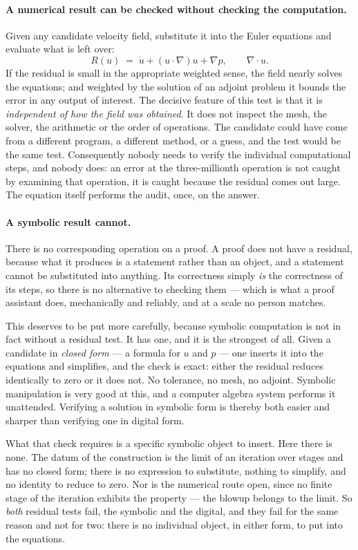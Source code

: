 \documentclass[11pt]{article}
\begin{document}
\paragraph{A numerical result can be checked without checking the computation.} Given any candidate
velocity field, substitute it into the Euler equations and evaluate what is left over:
\[
R(u) \;=\; \dot u + (u\cdot\nabla)u + \nabla p ,\qquad \nabla\cdot u .
\]
If the residual is small in the appropriate weighted sense, the field nearly solves the equations;
and weighted by the solution of an adjoint problem it bounds the error in any output of interest.
The decisive feature of this test is that it is \emph{independent of how the field was obtained}. It
does not inspect the mesh, the solver, the arithmetic or the order of operations. The candidate could
have come from a different program, a different method, or a guess, and the test would be the same
test. Consequently nobody needs to verify the individual computational steps, and nobody does: an
error at the three-millionth operation is not caught by examining that operation, it is caught
because the residual comes out large. The equation itself performs the audit, once, on the answer.

\paragraph{A symbolic result cannot.} There is no corresponding operation on a proof. A proof does
not have a residual, because what it produces is a statement rather than an object, and a statement
cannot be substituted into anything. Its correctness simply \emph{is} the correctness of its steps,
so there is no alternative to checking them --- which is what a proof assistant does, mechanically
and reliably, and at a scale no person matches.

This deserves to be put more carefully, because symbolic computation is not in fact without a
residual test. It has one, and it is the strongest of all. Given a candidate in \emph{closed form}
--- a formula for $u$ and $p$ --- one inserts it into the equations and simplifies, and the check is
exact: either the residual reduces identically to zero or it does not. No tolerance, no mesh, no
adjoint. Symbolic manipulation is very good at this, and a computer algebra system performs it
unattended. Verifying a solution in symbolic form is thereby both easier and sharper than verifying
one in digital form.

What that check requires is a specific symbolic object to insert. Here there is none. The datum of
the construction is the limit of an iteration over stages and has no closed form; there is no
expression to substitute, nothing to simplify, and no identity to reduce to zero. Nor is the
numerical route open, since no finite stage of the iteration exhibits the property --- the blowup
belongs to the limit. So \emph{both} residual tests fail, the symbolic and the digital, and they fail
for the same reason and not for two: there is no individual object, in either form, to put into the
equations.
\end{document}
